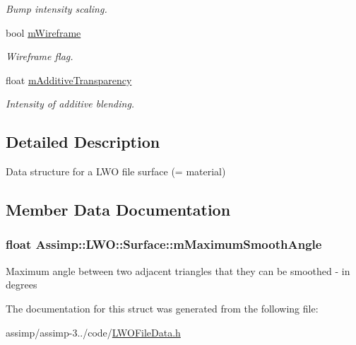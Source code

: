 \begin{DoxyCompactItemize}
\begin{DoxyCompactList}\small\item\em Bump intensity scaling. \end{DoxyCompactList}\item 
\hypertarget{struct_assimp_1_1_l_w_o_1_1_surface_a105664c38ccf9a579ccf768ddfa7388f}{bool \hyperlink{struct_assimp_1_1_l_w_o_1_1_surface_a105664c38ccf9a579ccf768ddfa7388f}{m\+Wireframe}}\label{struct_assimp_1_1_l_w_o_1_1_surface_a105664c38ccf9a579ccf768ddfa7388f}

\begin{DoxyCompactList}\small\item\em Wireframe flag. \end{DoxyCompactList}\item 
\hypertarget{struct_assimp_1_1_l_w_o_1_1_surface_a0a97eee56c6ea116bc01634a80145448}{float \hyperlink{struct_assimp_1_1_l_w_o_1_1_surface_a0a97eee56c6ea116bc01634a80145448}{m\+Additive\+Transparency}}\label{struct_assimp_1_1_l_w_o_1_1_surface_a0a97eee56c6ea116bc01634a80145448}

\begin{DoxyCompactList}\small\item\em Intensity of additive blending. \end{DoxyCompactList}\end{DoxyCompactItemize}


\subsection{Detailed Description}
Data structure for a L\+W\+O file surface (= material) 

\subsection{Member Data Documentation}
\hypertarget{struct_assimp_1_1_l_w_o_1_1_surface_ae3deccd83d53dc142d75673fea75885d}{
\subsubsection[{m\+Maximum\+Smooth\+Angle}]{\setlength{\rightskip}{0pt plus 5cm}float Assimp\+::\+L\+W\+O\+::\+Surface\+::m\+Maximum\+Smooth\+Angle}}\label{struct_assimp_1_1_l_w_o_1_1_surface_ae3deccd83d53dc142d75673fea75885d}
Maximum angle between two adjacent triangles that they can be smoothed -\/ in degrees 

The documentation for this struct was generated from the following file\+:\begin{DoxyCompactItemize}
\item 
assimp/assimp-\/3../code/\hyperlink{_l_w_o_file_data_8h}{L\+W\+O\+File\+Data.\+h}\end{DoxyCompactItemize}
